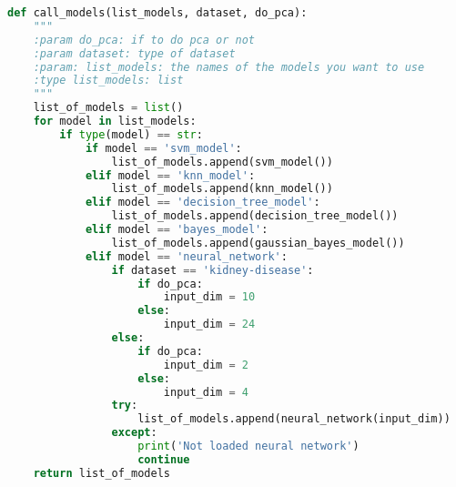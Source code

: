 \documentclass[11pt,a4paper]{article}
\begin{document}
\begin{lstlisting}[language=Python,basicstyle=\tiny]
def call_models(list_models, dataset, do_pca):
    """
    :param do_pca: if to do pca or not
    :param dataset: type of dataset
    :param: list_models: the names of the models you want to use
    :type list_models: list
    """
    list_of_models = list()
    for model in list_models:
        if type(model) == str:
            if model == 'svm_model':
                list_of_models.append(svm_model())
            elif model == 'knn_model':
                list_of_models.append(knn_model())
            elif model == 'decision_tree_model':
                list_of_models.append(decision_tree_model())
            elif model == 'bayes_model':
                list_of_models.append(gaussian_bayes_model())
            elif model == 'neural_network':
                if dataset == 'kidney-disease':
                    if do_pca:
                        input_dim = 10
                    else:
                        input_dim = 24
                else:
                    if do_pca:
                        input_dim = 2
                    else:
                        input_dim = 4
                try:
                    list_of_models.append(neural_network(input_dim))
                except:
                    print('Not loaded neural network')
                    continue
    return list_of_models

\end{lstlisting}
\end{document}
